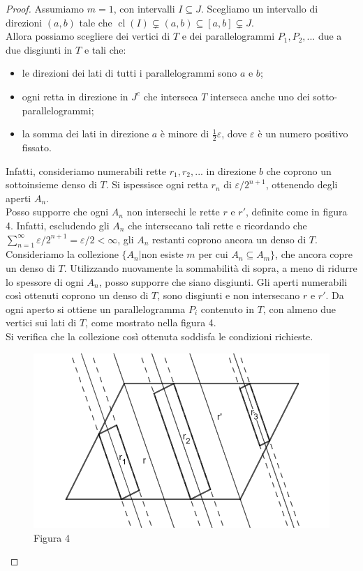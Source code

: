 \documentclass[a4paper, twoside]{article}
\newcommand{\e}{\varepsilon}
\newcommand{\<}{\langle}
\renewcommand{\>}{\rangle}
\begin{document}
\begin{proof}
	Assumiamo $m=1$, con intervalli $I \subseteq J$. Scegliamo un intervallo di direzioni $(a, b)$ tale che $\operatorname{cl}(I) \subsetneq(a, b) \subseteq[a, b] \subsetneq J$.\\
	Allora possiamo scegliere dei vertici di $T$ e dei parallelogrammi $P_1, P_2, ...$ due a due disgiunti in $T$ e tali che:
		\begin{itemize}
		\item le direzioni dei lati di tutti i parallelogrammi sono $a$ e $b$;
		\item ogni retta in direzione in $J^c$ che interseca $T$ interseca anche uno dei sotto-parallelogrammi;
		\item la somma dei lati in direzione $a$ è minore di $\frac{1}{2} \varepsilon$, dove $\varepsilon$ è un numero positivo fissato.
	\end{itemize}	
	Infatti, consideriamo numerabili rette $r_1, r_2, ...$ in direzione $b$ che coprono un sottoinsieme denso di $T$. Si ispessisce ogni retta $r_n$ di $\e/2^{n+1}$, ottenendo degli aperti $A_n$.\\
	Posso supporre che ogni $A_n$ non intersechi le rette $r$ e $r'$, definite come in figura 4. Infatti, escludendo gli $A_n$ che intersecano tali rette e ricordando che $\sum _{n=1}^\infty\e/2^{n+1}= \e/2 <\infty$, gli $A_n$ restanti coprono ancora un denso di $T$.\\
	Consideriamo la collezione $\{A_n | $non esiste $m$ per cui $A_n \subseteq A_m\}$, che ancora copre un denso di $T$. Utilizzando nuovamente la sommabilità di sopra, a meno di ridurre lo spessore di ogni $A_n$, posso supporre che siano disgiunti. Gli aperti numerabili così ottenuti coprono un denso di $T$, sono disgiunti e non intersecano $r$ e $r'$. Da ogni aperto si ottiene un parallelogramma $P_i$ contenuto in $T$, con almeno due vertici sui lati di $T$, come mostrato nella figura 4.\\
	Si verifica che la collezione così ottenuta soddisfa le condizioni richieste.\\
	
\begin{figure} [h!]
	\includegraphics[width=0.6\columnwidth]{disegno}
	\centering
	\caption{Figura 4}
\end{figure}


\end{proof}
\end{document}
